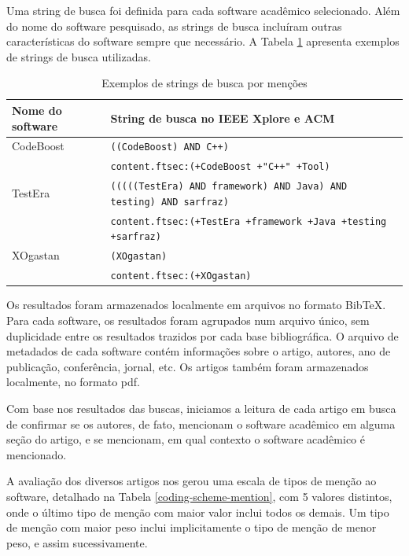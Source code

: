 Uma string de busca foi definida para cada software acadêmico selecionado.
Além do nome do software pesquisado, as strings de busca incluíram outras
características do software sempre que necessário.
A Tabela \ref{exemplos-strings} apresenta exemplos de strings de busca utilizadas.

\begin{table}[h]
\caption{Exemplos de strings de busca por menções}
\centering
\begin{tabular}{ l p{10cm} }
  \hline
  Nome do software   & String de busca no IEEE Xplore e ACM \\
  \hline
  CodeBoost          & {\tt ((CodeBoost) AND C++)} \\
                     & {\tt content.ftsec:(+CodeBoost +"C++" +Tool)} \\
  \hline
  TestEra            & {\tt (((((TestEra) AND framework) AND Java) AND testing) AND sarfraz)} \\
                     & {\tt content.ftsec:(+TestEra +framework +Java +testing +sarfraz)} \\
  \hline
  XOgastan           & {\tt (XOgastan)} \\
                     & {\tt content.ftsec:(+XOgastan)} \\
  \hline
\end{tabular}
\label{exemplos-strings}
\end{table}

Os resultados foram armazenados localmente em arquivos no formato BibTeX.
Para cada software, os resultados foram agrupados num arquivo único, sem duplicidade
entre os resultados trazidos por cada base bibliográfica. %
O arquivo de metadados de cada software contém informações sobre 
o artigo, autores, ano de publicação, conferência, jornal, etc.
Os artigos também foram armazenados localmente, no formato pdf.

Com base nos resultados das buscas, iniciamos a leitura
de cada artigo em busca de confirmar se os autores, de fato, mencionam o
software acadêmico em alguma seção do artigo, e se mencionam, em qual contexto
o software acadêmico é mencionado.

A avaliação dos diversos artigos nos gerou uma escala de tipos de menção ao
software, detalhado na Tabela \ref{coding-scheme-mention}, com 5 valores
distintos, onde o último tipo de menção com maior valor inclui todos os demais.
Um tipo de menção com maior peso inclui implicitamente o tipo de
menção de menor peso, e assim sucessivamente.

